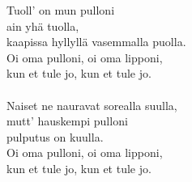 
Tuoll' on mun pulloni \\ ain yhä tuolla, \\ kaapissa hyllyllä vasemmalla puolla. \\ Oi oma pulloni, oi oma lipponi, \\ kun et tule jo, kun et tule jo. \\ \hspace{10mm} \\ Naiset ne nauravat sorealla suulla, \\ mutt' hauskempi pulloni \\ pulputus on kuulla. \\ Oi oma pulloni, oi oma lipponi, \\ kun et tule jo, kun et tule jo.